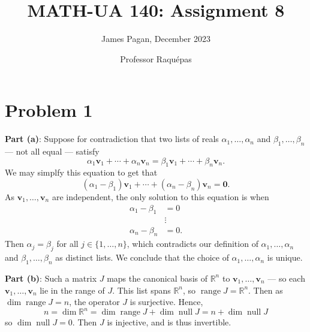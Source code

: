 \documentclass[11pt]{article}
\title{MATH-UA 140: Assignment 8}
\author{James Pagan, December 2023}
\date{Professor Raquépas}
\renewcommand{\vec}[1]{\mathbf{#1}}
\begin{document}
\maketitle
\tableofcontents
\newpage


\section{Problem 1}

\textbf{Part (a)}: Suppose for contradiction that two lists of reals $\alpha_{1}, \ldots, \alpha_{n}$ and $\beta_{1}, \ldots, \beta_{n}$ --- not all equal --- satisfy
\[
	\alpha_{1}\vec{v}_{1} + \cdots + \alpha_{n}\vec{v}_{n} = \beta_{1}\vec{v}_{1} + \cdots + \beta_{n}\vec{v}_{n}.
\]
We may simplfy this equation to get that
\[
	(\alpha_{1} - \beta_{1})\vec{v}_{1} + \cdots + (\alpha_{n} - \beta_{n})\vec{v}_{n} = \vec{0}.
\]
As $\vec{v}_{1}, \ldots, \vec{v}_{n}$ are independent, the only solution to this equation is when
\begin{align*}
	\alpha_{1} - \beta_{1} &= 0 \\
						   & \vdots \\
	\alpha_{n} - \beta_{n} &= 0.
\end{align*}
Then $\alpha_{j} = \beta_{j}$ for all $j \in \{ 1, \ldots, n \}$, which contradicts our definition of $\alpha_{1}, \ldots, \alpha_{n}$ and $\beta_{1}, \ldots, \beta_{n}$ as distinct lists. We conclude that the choice of $\alpha_{1}, \ldots, \alpha_{n}$ is unique.

\textbf{Part (b)}: Such a matrix $J$ maps the canonical basis of $\mathbb{R}^{n}$ to $\vec{v}_{1}, \ldots, \vec{v}_{n}$ --- so each $\vec{v}_{1}, \ldots, \vec{v}_{n}$ lie in the range of $J$. This list spans $\mathbb{R}^{n}$, so $\operatorname{range} J = \mathbb{R}^{n}$. Then as $\dim \operatorname{range} J = n$, the operator $J$ is surjective. Hence,
\[
	n = \dim \mathbb{R}^{n} = \dim \operatorname{range} J + \dim \operatorname{null} J = n + \dim \operatorname{null} J
\]
so $\dim \operatorname{null} J = 0$. Then $J$ is injective, and is thus invertible.
\end{document}
